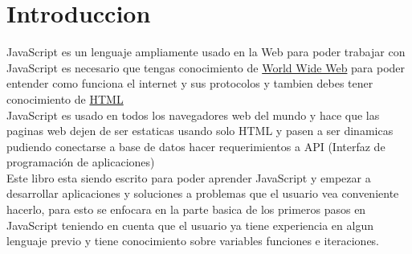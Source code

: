 \chapter{Introduccion}
JavaScript es un lenguaje ampliamente usado en la Web para poder trabajar con JavaScript es necesario que tengas conocimiento de \href{https://developer.mozilla.org/en-US/docs/Glossary/World_Wide_Web}{World Wide Web} para poder entender como funciona el internet y sus protocolos y tambien debes tener conocimiento de \href{https://developer.mozilla.org/es/docs/Glossary/HTML}{HTML}
\\

JavaScript es usado en todos los navegadores web del mundo y hace que las paginas web dejen de ser estaticas usando solo HTML y pasen a ser dinamicas pudiendo conectarse a base de datos hacer requerimientos a API (Interfaz de programación de aplicaciones)
\\

Este libro esta siendo escrito para poder aprender JavaScript y empezar a desarrollar aplicaciones y soluciones a problemas que el usuario vea conveniente hacerlo, para esto se enfocara en la parte basica de los primeros pasos en JavaScript teniendo en cuenta que el usuario ya tiene experiencia en algun lenguaje previo y tiene conocimiento sobre variables funciones e iteraciones.


%
%
%
%
%
%
%
%
